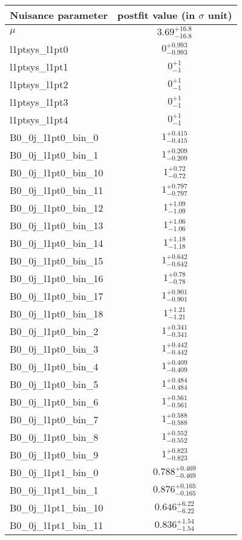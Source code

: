 
\begin{tabular}{|l|c|}
\hline
Nuisance parameter & postfit value (in $\sigma$ unit) \\\hline
$\mu$ & $3.69^{+16.8}_{-16.8}$ \\
l1ptsys\_l1pt0 & $0^{+0.993}_{-0.993}$ \\
l1ptsys\_l1pt1 & $0^{+1}_{-1}$ \\
l1ptsys\_l1pt2 & $0^{+1}_{-1}$ \\
l1ptsys\_l1pt3 & $0^{+1}_{-1}$ \\
l1ptsys\_l1pt4 & $0^{+1}_{-1}$ \\
B0\_0j\_l1pt0\_bin\_0 & $1^{+0.415}_{-0.415}$ \\
B0\_0j\_l1pt0\_bin\_1 & $1^{+0.209}_{-0.209}$ \\
B0\_0j\_l1pt0\_bin\_10 & $1^{+0.72}_{-0.72}$ \\
B0\_0j\_l1pt0\_bin\_11 & $1^{+0.797}_{-0.797}$ \\
B0\_0j\_l1pt0\_bin\_12 & $1^{+1.09}_{-1.09}$ \\
B0\_0j\_l1pt0\_bin\_13 & $1^{+1.06}_{-1.06}$ \\
B0\_0j\_l1pt0\_bin\_14 & $1^{+1.18}_{-1.18}$ \\
B0\_0j\_l1pt0\_bin\_15 & $1^{+0.642}_{-0.642}$ \\
B0\_0j\_l1pt0\_bin\_16 & $1^{+0.78}_{-0.78}$ \\
B0\_0j\_l1pt0\_bin\_17 & $1^{+0.901}_{-0.901}$ \\
B0\_0j\_l1pt0\_bin\_18 & $1^{+1.21}_{-1.21}$ \\
B0\_0j\_l1pt0\_bin\_2 & $1^{+0.341}_{-0.341}$ \\
B0\_0j\_l1pt0\_bin\_3 & $1^{+0.442}_{-0.442}$ \\
B0\_0j\_l1pt0\_bin\_4 & $1^{+0.409}_{-0.409}$ \\
B0\_0j\_l1pt0\_bin\_5 & $1^{+0.484}_{-0.484}$ \\
B0\_0j\_l1pt0\_bin\_6 & $1^{+0.561}_{-0.561}$ \\
B0\_0j\_l1pt0\_bin\_7 & $1^{+0.588}_{-0.588}$ \\
B0\_0j\_l1pt0\_bin\_8 & $1^{+0.552}_{-0.552}$ \\
B0\_0j\_l1pt0\_bin\_9 & $1^{+0.823}_{-0.823}$ \\
B0\_0j\_l1pt1\_bin\_0 & $0.788^{+0.469}_{-0.469}$ \\
B0\_0j\_l1pt1\_bin\_1 & $0.876^{+0.165}_{-0.165}$ \\
B0\_0j\_l1pt1\_bin\_10 & $0.646^{+6.22}_{-6.22}$ \\
B0\_0j\_l1pt1\_bin\_11 & $0.836^{+1.54}_{-1.54}$ \\

\end{tabular}
